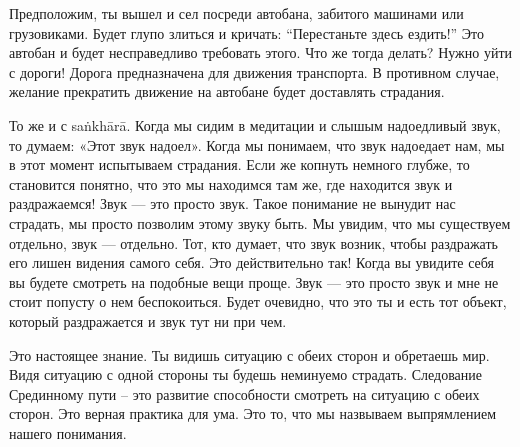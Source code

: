 Предположим, ты вышел и сел посреди автобана, забитого машинами или грузовиками. Будет глупо злиться и кричать: “Перестаньте здесь ездить!” Это автобан и будет несправедливо требовать этого. Что же тогда делать? Нужно уйти с дороги! Дорога предназначена для движения транспорта. В противном случае, желание прекратить движение на автобане будет доставлять страдания.

То же и с sa\.nkh\={a}r\={a}. Когда мы сидим в медитации и слышым надоедливый звук, то думаем: «Этот звук надоел». Когда мы понимаем, что звук надоедает нам, мы в этот момент испытываем страдания. Если же копнуть немного глубже, то становится понятно, что это мы находимся там же, где находится звук и раздражаемся! Звук — это просто звук. Такое понимание не вынудит нас страдать, мы просто позволим этому звуку быть. Мы увидим, что мы существуем отдельно, звук — отдельно. Тот, кто думает, что звук возник, чтобы раздражать его лишен видения самого себя. Это действительно так! Когда вы увидите себя вы будете смотреть на подобные вещи проще. Звук — это просто звук и мне не стоит попусту о нем беспокоиться. Будет очевидно, что это ты и есть тот объект, который раздражается и звук тут ни при чем.

Это настоящее знание. Ты видишь ситуацию с обеих сторон и обретаешь мир. Видя ситуацию с одной стороны ты будешь неминуемо страдать. Следование Срединному пути – это развитие способности смотреть на ситуацию с обеих сторон. Это верная практика для ума. Это то, что мы назвываем выпрямлением нашего понимания.

